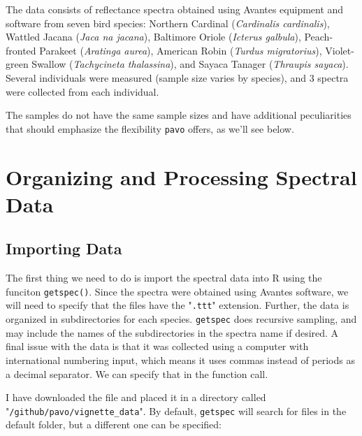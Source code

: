 \documentclass{article}
\newcommand{\pavo}{{\tt pavo}}  %
\newcommand{\code}[1]{{\tt #1}}  %
\begin{document}
The data consists of reflectance spectra obtained using Avantes equipment and software from 
seven bird species: Northern Cardinal (\emph{Cardinalis cardinalis}), Wattled Jacana (\emph{Jaca
na jacana}), Baltimore Oriole (\emph{Icterus galbula}), Peach-fronted Parakeet (\emph{Aratinga 
aurea}), American Robin (\emph{Turdus migratorius}), Violet-green Swallow (\emph{Tachycineta 
thalassina}), and Sayaca Tanager (\emph{Thraupis sayaca}). Several individuals were measured 
(sample size varies by species), and 3 spectra were collected from each individual.

The samples do not have the same sample sizes and have additional peculiarities that should 
emphasize the flexibility \pavo{} offers, as we'll see below.

\section{Organizing and Processing Spectral Data}

\subsection{Importing Data}

The first thing we need to do is import the spectral data into R using the funciton 
\code{getspec()}. Since the spectra were obtained using Avantes software, we will need to 
specify that the files have the "\code{.ttt}" extension. Further, the data is organized in 
subdirectories for each species. \code{getspec} does recursive sampling, and may include the 
names of the subdirectories in the spectra name if desired. A final issue with the data is that 
it was collected using a computer with international numbering input, which means it uses commas 
instead of periods as a decimal separator. We can specify that in the function call.

I have downloaded the file and placed it in a directory called 
"\nolinkurl{/github/pavo/vignette_data}". By default, \code{getspec} will search for files in 
the default folder, but a different one can be specified:
\end{document}
